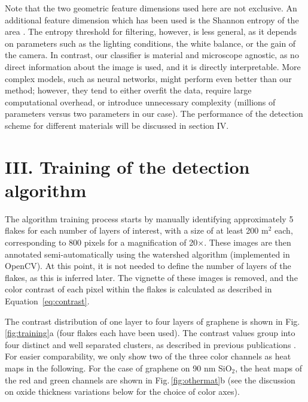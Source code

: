 \documentclass[reprint, prl, superscriptaddress, floatfix]{revtex4-2}
\newcommand{\fig}[1]{Fig.\,\ref{#1}}
\begin{document}
Note that the two geometric feature dimensions used here are not exclusive. 
An additional feature dimension which has been used is the Shannon entropy of the area \cite{Masubuchi2018}.
The entropy threshold for filtering, however, is less general, as it depends on parameters such as the lighting conditions, the white balance, or the gain of the camera. 
In contrast, our classifier is material and microscope agnostic, as no direct information about the image is used, and it is directly interpretable. 
More complex models, such as neural networks, might perform even better than our method; however, they tend to either overfit the data, require large computational overhead, or introduce unnecessary complexity (millions of parameters versus two parameters in our case).
The performance of the detection scheme for different materials will be discussed in section IV.


\section{III. Training of the detection algorithm}


The algorithm training process starts by manually identifying approximately 5 flakes for each number of layers of interest, with a size of at least 200 \textmu m$^2$ each, corresponding to 800 pixels for a magnification of 20$\times$.
These images are then annotated semi-automatically using the watershed algorithm (implemented in OpenCV).
At this point, it is not needed to define the number of layers of the flakes, as this is inferred later. 
The vignette of these images is removed, and the color contrast of each pixel within the flakes is calculated as described in Equation~\ref{eq:contrast}.

The contrast distribution of one layer to four layers of graphene is shown in \fig{fig:training}a (four flakes each have been used).
The contrast values group into four distinct and well separated clusters, as described in previous publications \cite{Masubuchi2019, Li2019Sep, Sterbentz2021Mar}.
For easier comparability, we only show two of the three color channels as heat maps in the following. 
For the case of graphene on 90 nm SiO$_2$, the heat maps of the red and green channels are shown in \fig{fig:othermat}b (see the discussion on oxide thickness variations below for the choice of color axes).
\end{document}

